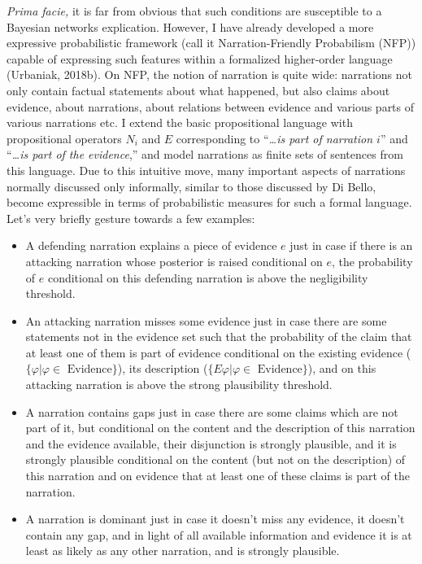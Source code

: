 \documentclass[11pt,dvipsnames,enabledeprecatedfontcommands]{scrartcl}
\begin{document}
\vspace{2mm}

\emph{Prima facie,} it is far from obvious that such conditions are
susceptible to a Bayesian networks explication. However, I have already
developed a more expressive probabilistic framework (call it
Narration-Friendly Probabilism (NFP)) capable of expressing such
features within a formalized higher-order language (Urbaniak, 2018b). On
NFP, the notion of narration is quite wide: narrations not only contain
factual statements about what happened, but also claims about evidence,
about narrations, about relations between evidence and various parts of
various narrations etc. I extend the basic propositional language with
propositional operators \(N_i\) and \(E\) corresponding to
``\emph{\dots is part of narration $i$}'' and
``\emph{\dots is part of the evidence},'' and model narrations as finite
sets of sentences from this language. Due to this intuitive move, many
important aspects of narrations normally discussed only informally,
similar to those discussed by Di Bello, become expressible in terms of
probabilistic measures for such a formal language. Let's very briefly
gesture towards a few examples:

\begin{itemize}\setlength\itemsep{-1mm}
 \item A defending narration explains  a piece of evidence  $e$ just in case  if there is an  attacking narration whose posterior is raised conditional on $e$, the probability of $e$ conditional on this defending narration is above the negligibility threshold.
 \item An attacking narration misses some evidence just in case there are some statements not in the evidence set such that the probability of the claim that at least one of them is part of evidence conditional on the existing evidence ($\{\varphi\vert \varphi \in \mbox{ Evidence}\}$), its description ($\{E\varphi\vert \varphi \in \mbox{ Evidence}\}$), and on this attacking narration is above the strong plausibility threshold. 
 \item A narration contains gaps just in case there are some claims which are not part of it, but conditional on the content and the description of this narration and the evidence available, their disjunction is strongly plausible, and it is strongly plausible conditional on the content (but not on the description) of this narration and on evidence that at least one of these claims is part of the narration.
 \item  A narration is dominant just in case it doesn't miss any evidence, it doesn’t contain any gap, and in light of all available information and evidence it is at least as likely as any other narration, and is strongly plausible.
 \end{itemize}
\end{document}
